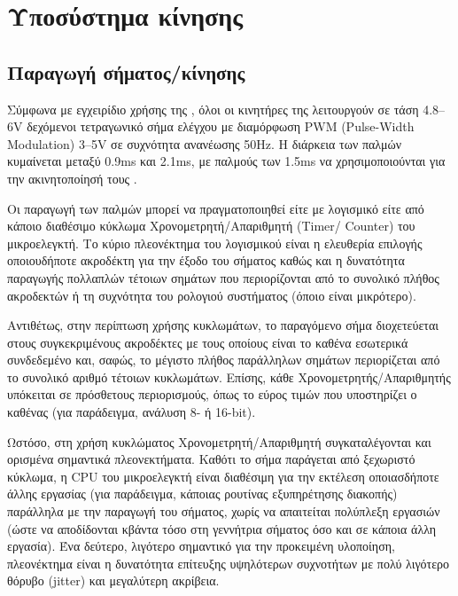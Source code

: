 
\section{Υποσύστημα κίνησης}


%
%

\subsection{Παραγωγή σήματος\slash κίνησης}

Σύμφωνα με εγχειρίδιο χρήσης της \textcite{hitec02}, όλοι οι κινητήρες της
λειτουργούν σε τάση 4.8--6V δεχόμενοι τετραγωνικό σήμα ελέγχου με διαμόρφωση
PWM (\textenglish{Pulse-Width Modulation}) 3--5V σε συχνότητα ανανέωσης 50Hz.
Η διάρκεια των παλμών κυμαίνεται μεταξύ 0.9ms και 2.1ms, με παλμούς των 1.5ms να
χρησιμοποιούνται για την ακινητοποίησή τους \parencite{hitec02}.

Οι παραγωγή των παλμών μπορεί να πραγματοποιηθεί είτε με λογισμικό είτε από
κάποιο διαθέσιμο κύκλωμα Χρονομετρητή\slash Απαριθμητή (\textenglish{Timer\slash
Counter}) του μικροελεγκτή. Το κύριο πλεονέκτημα του λογισμικού είναι η
ελευθερία επιλογής οποιουδήποτε ακροδέκτη για την έξοδο του σήματος καθώς και η
δυνατότητα παραγωγής πολλαπλών τέτοιων σημάτων που περιορίζονται από το συνολικό
πλήθος ακροδεκτών ή τη συχνότητα του ρολογιού συστήματος (όποιο είναι
μικρότερο).

Αντιθέτως, στην περίπτωση χρήσης κυκλωμάτων, το παραγόμενο σήμα διοχετεύεται
στους συγκεκριμένους ακροδέκτες με τους οποίους είναι το καθένα εσωτερικά
συνδεδεμένο και, σαφώς, το μέγιστο πλήθος παράλληλων σημάτων περιορίζεται από το
συνολικό αριθμό τέτοιων κυκλωμάτων. Επίσης, κάθε Χρονομετρητής\slash Απαριθμητής
υπόκειται σε πρόσθετους περιορισμούς, όπως το εύρος τιμών που υποστηρίζει ο
καθένας (για παράδειγμα, ανάλυση 8- ή 16-bit).

Ωστόσο, στη χρήση κυκλώματος Χρονομετρητή\slash Απαριθμητή συγκαταλέγονται και
ορισμένα σημαντικά πλεονεκτήματα.
Καθότι το σήμα παράγεται από ξεχωριστό κύκλωμα, η CPU του μικροελεγκτή είναι
διαθέσιμη για την εκτέλεση οποιασδήποτε άλλης εργασίας (για παράδειγμα, κάποιας
ρουτίνας εξυπηρέτησης διακοπής) παράλληλα με την παραγωγή του σήματος, χωρίς να
απαιτείται πολύπλεξη εργασιών (ώστε να αποδίδονται κβάντα τόσο στη γεννήτρια
σήματος όσο και σε κάποια άλλη εργασία). Ένα δεύτερο, λιγότερο σημαντικό για την
προκειμένη υλοποίηση, πλεονέκτημα είναι η δυνατότητα επίτευξης υψηλότερων
συχνοτήτων με πολύ λιγότερο θόρυβο (\textenglish{jitter}) και μεγαλύτερη
ακρίβεια.

